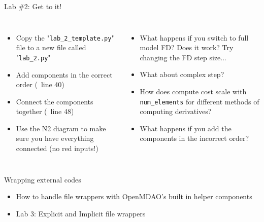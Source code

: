 \documentclass[aspectratio=169, usenames,dvipsnames, 14pt]{beamer}
\begin{document}
\begin{frame}{Lab \#2: Get to it!}
	\begin{columns}
			\begin{itemize}
				\item \small Copy the "\texttt{lab\_2\_template.py}" file to a new file called "\texttt{lab\_2.py}"
				\item \small Add components in the correct order (~line 40)
				\item \small Connect the components together (~line 48)
				\item \small Use the N2 diagram to make sure you have everything connected (no red inputs!)
			\end{itemize}
			\begin{itemize}
				\item \small What happens if you switch to full model FD? Does it work? Try changing the FD step size...
				\item \small What about complex step?
				\item \small How does compute cost scale with \texttt{num\_elements} for different methods of computing derivatives?
				\item \small What happens if you add the components in the incorrect order?
			\end{itemize}
	\end{columns}
\end{frame}

\begingroup
{}
\begin{frame}{Wrapping external codes}
	\begin{itemize}
		\item How to handle file wrappers with OpenMDAO's built in helper components
		\item Lab 3: Explicit and Implicit file wrappers
	\end{itemize}
\end{frame}
\endgroup
\end{document}
